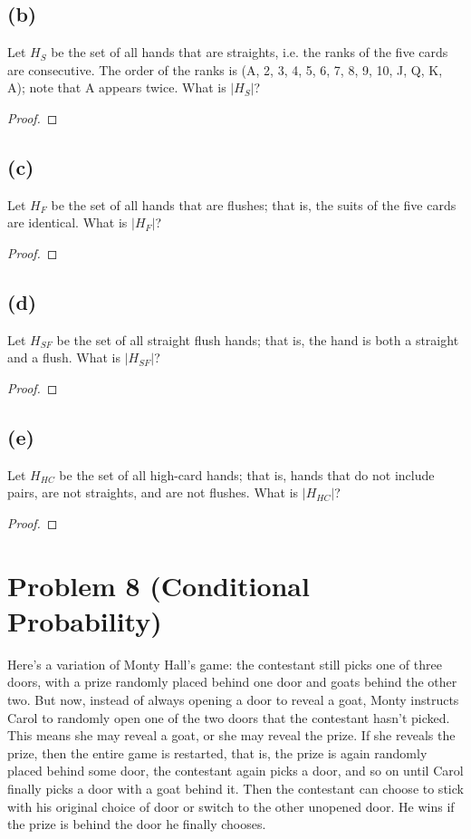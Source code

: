 \documentclass[14pt]{extarticle}
\begin{document}
\subsection{(b)}
Let $H_{S}$ be the set of all hands that are straights, i.e. the ranks of the five cards are consecutive. The order of the ranks is (A, 2, 3, 4, 5, 6, 7, 8, 9, 10, J, Q, K, A); note that A appears twice. What is $|H_{S}|$?
\begin{proof}
\end{proof}
\subsection{(c)}
Let $H_{F}$ be the set of all hands that are flushes; that is, the suits of the five cards are identical. What is $|H_{F}|$?
\begin{proof}
\end{proof}
\subsection{(d)}
Let $H_{SF}$ be the set of all straight flush hands; that is, the hand is both a straight and a flush. What is $|H_{SF}|$?
\begin{proof}
\end{proof}
\subsection{(e)}
Let $H_{HC}$ be the set of all high-card hands; that is, hands that do not include pairs, are not straights, and are not flushes. What is $|H_{HC}|$?
\begin{proof}
\end{proof}

\section{Problem 8 (Conditional Probability)}
Here’s a variation of Monty Hall’s game: the contestant still picks one of three doors, with a prize randomly placed behind one door and goats behind the other two. But now, instead of always opening a door to reveal a goat, Monty instructs Carol to randomly open one of the two doors that the contestant hasn’t picked. This means she may reveal a goat, or she may reveal the prize. If she reveals the prize, then the entire game is restarted, that is, the prize is again randomly placed behind some door, the contestant again picks a door, and so on until Carol finally picks a door with a goat behind it. Then the contestant can choose to stick with his original choice of door or switch to the other unopened door. He wins if the prize is behind the door he
finally chooses.
\end{document}
